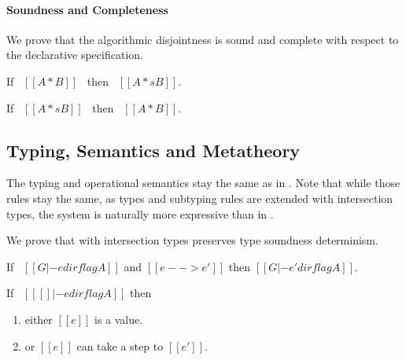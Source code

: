 \paragraph{Soundness and Completeness}

We prove that the algorithmic disjointness is sound and complete with respect to
the declarative specification.

\begin{lemma}
  If \ $[[A * B]]$ \ then \ $[[A *s B]]$.
\label{lemma:inter:disj-sound}
\end{lemma}

\begin{lemma}
  If \ $[[A *s B]]$ \ then \ $[[A * B]]$.
\label{lemma:inter:disj-complete}
\end{lemma}


\subsection{Typing, Semantics and Metatheory}

The typing and operational semantics stay the same as in . Note
that while those rules stay the same, as types and subtyping rules are extended
with intersection types, the system is naturally more expressive than
in .

We prove that \cal with intersection types preserves type soundness determinism.

\begin{lemma}
\label{lemma:inter:preservation}
  If \ $[[G |- e dirflag A]]$ and $[[e --> e']]$ then $[[G |- e' dirflag A]]$.
\end{lemma}

\begin{lemma}[Progress]
\label{lemma:inter:progress}
If \ $[[ [] |- e dirflag A]]$ then
 \begin{enumerate}
  \item either $[[e]]$ is a value.
  \item or $[[e]]$ can take a step to $[[e']]$.
  \end{enumerate}
\end{lemma}

\begin{comment}
\begin{lemma}[Substitution]
\label{lemma:inter:substitution}
  If \ $[[G, x:B , G1 |- e dirflag A]]$ \ and \ $[[G |- e' => B]]$
  then \ $[[G, G1 |- e [ x ~> e' ] dirflag A]]$
\end{lemma}
\end{comment}

